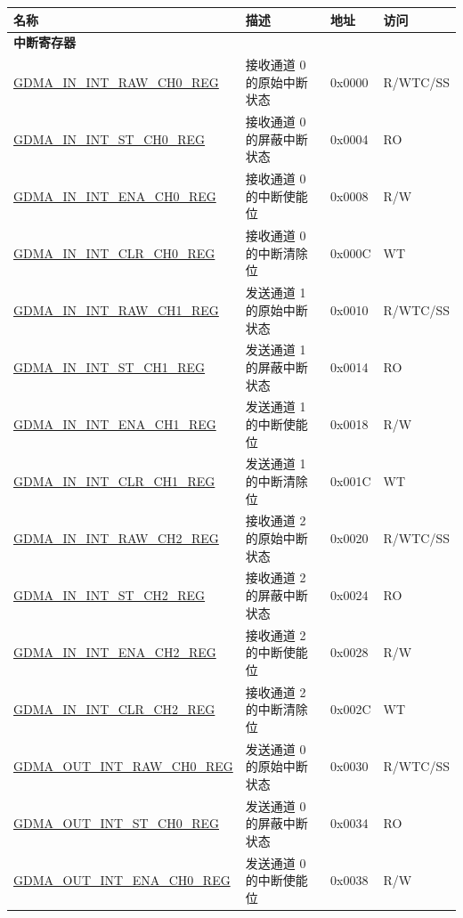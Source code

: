\begin{longtable}{ | p{6cm} | p{7.2cm} | p{1.3cm} | p{1cm} | }
\hline\rowcolor{lightgray}
\textbf{名称} & \textbf{描述} &  \textbf{地址} & \textbf{访问} \\ \hline
\endhead
\multicolumn{4}{|l|}{\textbf{中断寄存器}} \\ \hline
\hyperref[regdesc:GDMAININTRAWCHNREG]{GDMA\_IN\_INT\_RAW\_CH0\_REG} & 接收通道 0 的原始中断状态  & 0x0000 & R/WTC/SS \\ \hline
\hyperref[regdesc:GDMAININTSTCHNREG]{GDMA\_IN\_INT\_ST\_CH0\_REG} & 接收通道 0 的屏蔽中断状态 & 0x0004 & RO \\ \hline
\hyperref[regdesc:GDMAININTENACHNREG]{GDMA\_IN\_INT\_ENA\_CH0\_REG} & 接收通道 0 的中断使能位 & 0x0008 & R/W \\ \hline
\hyperref[regdesc:GDMAININTCLRCHNREG]{GDMA\_IN\_INT\_CLR\_CH0\_REG} & 接收通道 0 的中断清除位 & 0x000C & WT \\ \hline
\hyperref[regdesc:GDMAININTRAWCHNREG]{GDMA\_IN\_INT\_RAW\_CH1\_REG} & 发送通道 1 的原始中断状态  & 0x0010 & R/WTC/SS \\ \hline
\hyperref[regdesc:GDMAININTSTCHNREG]{GDMA\_IN\_INT\_ST\_CH1\_REG} & 发送通道 1 的屏蔽中断状态 & 0x0014 & RO \\ \hline
\hyperref[regdesc:GDMAININTENACHNREG]{GDMA\_IN\_INT\_ENA\_CH1\_REG} & 发送通道 1 的中断使能位 & 0x0018 & R/W \\ \hline
\hyperref[regdesc:GDMAININTCLRCHNREG]{GDMA\_IN\_INT\_CLR\_CH1\_REG} & 发送通道 1 的中断清除位 & 0x001C & WT \\ \hline
\hyperref[regdesc:GDMAININTRAWCHNREG]{GDMA\_IN\_INT\_RAW\_CH2\_REG} & 接收通道 2 的原始中断状态  & 0x0020 & R/WTC/SS \\ \hline
\hyperref[regdesc:GDMAININTSTCHNREG]{GDMA\_IN\_INT\_ST\_CH2\_REG} & 接收通道 2 的屏蔽中断状态 & 0x0024 & RO \\ \hline
\hyperref[regdesc:GDMAININTENACHNREG]{GDMA\_IN\_INT\_ENA\_CH2\_REG} & 接收通道 2 的中断使能位 & 0x0028 & R/W \\ \hline
\hyperref[regdesc:GDMAININTCLRCHNREG]{GDMA\_IN\_INT\_CLR\_CH2\_REG} & 接收通道 2 的中断清除位 & 0x002C & WT \\ \hline
\hyperref[regdesc:GDMAOUTINTRAWCHNREG]{GDMA\_OUT\_INT\_RAW\_CH0\_REG} & 发送通道 0 的原始中断状态  & 0x0030 & R/WTC/SS \\ \hline
\hyperref[regdesc:GDMAOUTINTSTCHNREG]{GDMA\_OUT\_INT\_ST\_CH0\_REG} & 发送通道 0 的屏蔽中断状态 & 0x0034 & RO \\ \hline
\hyperref[regdesc:GDMAOUTINTENACHNREG]{GDMA\_OUT\_INT\_ENA\_CH0\_REG} & 发送通道 0 的中断使能位 & 0x0038 & R/W \\ \hline

\end{longtable}
